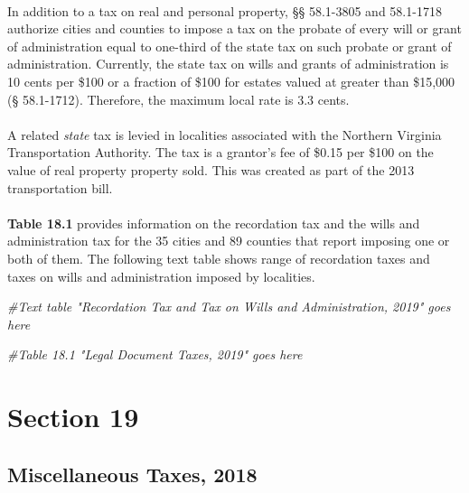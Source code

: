 \documentclass[
]{book}
\newenvironment{Shaded}{\begin{snugshade}}{\end{snugshade}}
\newcommand{\CommentTok}[1]{\textcolor[rgb]{0.56,0.35,0.01}{\textit{#1}}}
\begin{document}
~\\
\hspace*{0.333em}\hspace*{0.333em}In addition to a tax on real and personal property, §§ 58.1-3805 and 58.1-1718 authorize cities and counties to impose a tax on the probate of every will or grant of administration equal to one-third of the state tax on such probate or grant of administration. Currently, the state tax on wills and grants of administration is 10 cents per \$100 or a fraction of \$100 for estates valued at greater than \$15,000 (§ 58.1-1712). Therefore, the maximum local rate is 3.3 cents.\\
~\\
\hspace*{0.333em}\hspace*{0.333em}A related \emph{state} tax is levied in localities associated with the Northern Virginia Transportation Authority. The tax is a grantor's fee of \$0.15 per \$100 on the value of real property property sold. This was created as part of the 2013 transportation bill.\\
~\\
\hspace*{0.333em}\hspace*{0.333em}\textbf{Table 18.1} provides information on the recordation tax and the wills and administration tax for the 35 cities and 89 counties that report imposing one or both of them. The following text table shows range of recordation taxes and taxes on wills and administration imposed by localities.

\begin{Shaded}
\begin{Highlighting}[]
\CommentTok{\#Text table "Recordation Tax and Tax on Wills and Administration, 2019" goes here}

\CommentTok{\#Table 18.1 "Legal Document Taxes, 2019" goes here}
\end{Highlighting}
\end{Shaded}

\hypertarget{section-19}{%
\chapter{Section 19}\label{section-19}}

\hypertarget{miscellaneous-taxes-2018}{%
\section{Miscellaneous Taxes, 2018}\label{miscellaneous-taxes-2018}}
\end{document}
